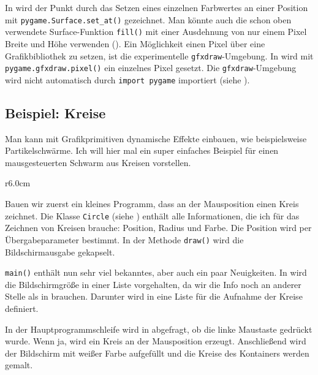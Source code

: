 In  wird der Punkt durch das Setzen eines einzelnen Farbwertes an einer Position mit \texttt{pygame.Surface.set\_at()} gezeichnet. Man könnte auch die schon oben verwendete Surface-Funktion \texttt{fill()} mit einer Ausdehnung von nur einem Pixel Breite und Höhe verwenden (). Ein Möglichkeit einen Pixel über eine Grafikbibliothek zu setzen, ist die experimentelle \texttt{gfxdraw}-Umgebung. In  wird mit \texttt{pygame.gfxdraw.pixel()} ein einzelnes Pixel gesetzt. Die \texttt{gfxdraw}-Umgebung wird nicht automatisch durch \texttt{import pygame} importiert (siehe ).

\subsection{Beispiel: Kreise}

Man kann mit Grafikprimitiven dynamische Effekte einbauen, wie beispielsweise Partikelschwärme. Ich will hier mal ein super einfaches Beispiel für einen mausgesteuerten Schwarm aus Kreisen vorstellen.

\begin{wrapfigure}[20]{r}{6.0cm}%
	\begin{center}%
		\vspace{-1cm}%
	\end{center}%
\end{wrapfigure}%
Bauen wir zuerst ein kleines Programm, dass an der Mausposition einen Kreis zeichnet. Die Klasse \texttt{Circle} (siehe ) enthält alle Informationen, die ich für das Zeichnen von Kreisen brauche: Position, Radius und Farbe. Die Position wird per Übergabeparameter bestimmt. In der Methode  \texttt{draw()} wird die Bildschirmausgabe gekapselt.

\texttt{main()} enthält nun sehr viel bekanntes, aber auch ein paar Neuigkeiten. In  wird die Bildschirmgröße in einer Liste vorgehalten, da wir die Info noch an anderer Stelle als in  brauchen. Darunter wird in  eine Liste für die Aufnahme der Kreise definiert. 

In der Hauptprogrammschleife wird in  abgefragt, ob die linke Maustaste gedrückt wurde. Wenn ja, wird ein Kreis an der Mausposition erzeugt. Anschließend wird der Bildschirm mit weißer Farbe aufgefüllt und die Kreise des Kontainers werden gemalt.


